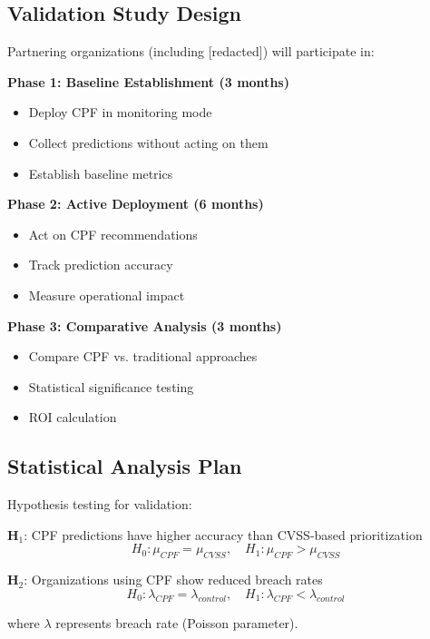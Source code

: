 \documentclass[11pt,a4paper]{article}
\begin{document}
\subsection{Validation Study Design}

Partnering organizations (including [redacted]) will participate in:

\textbf{Phase 1: Baseline Establishment (3 months)}
\begin{itemize}
\item Deploy CPF in monitoring mode
\item Collect predictions without acting on them
\item Establish baseline metrics
\end{itemize}

\textbf{Phase 2: Active Deployment (6 months)}
\begin{itemize}
\item Act on CPF recommendations
\item Track prediction accuracy
\item Measure operational impact
\end{itemize}

\textbf{Phase 3: Comparative Analysis (3 months)}
\begin{itemize}
\item Compare CPF vs. traditional approaches
\item Statistical significance testing
\item ROI calculation
\end{itemize}

\subsection{Statistical Analysis Plan}

Hypothesis testing for validation:

\textbf{H$_1$}: CPF predictions have higher accuracy than CVSS-based prioritization
\begin{equation}
H_0: \mu_{CPF} = \mu_{CVSS}, \quad H_1: \mu_{CPF} > \mu_{CVSS}
\end{equation}

\textbf{H$_2$}: Organizations using CPF show reduced breach rates
\begin{equation}
H_0: \lambda_{CPF} = \lambda_{control}, \quad H_1: \lambda_{CPF} < \lambda_{control}
\end{equation}

where $\lambda$ represents breach rate (Poisson parameter).
\end{document}

